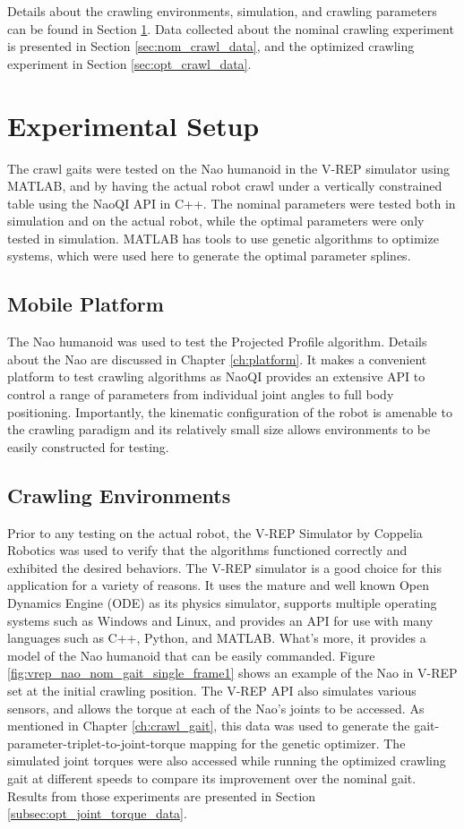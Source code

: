 Details about the crawling environments, simulation, and crawling parameters can be found in
Section \ref{sec:crawl_exp_setup}. Data collected about the nominal crawling experiment is
presented in Section \ref{sec:nom_crawl_data}, and the optimized crawling experiment in 
Section \ref{sec:opt_crawl_data}.

\FloatBarrier
\section{Experimental Setup} \label{sec:crawl_exp_setup}
The crawl gaits were tested on the Nao humanoid in the V-REP simulator using MATLAB,
and by having the actual robot crawl under a vertically constrained table using the NaoQI API in C++.
The nominal parameters were tested both in simulation and on the actual robot, while
the optimal parameters were only tested in simulation. MATLAB has tools to use genetic
algorithms to optimize systems, which were used here to generate the optimal parameter
splines.

\subsection{Mobile Platform}
The Nao humanoid was used to test the Projected Profile algorithm.
Details about the Nao are discussed in Chapter \ref{ch:platform}. It makes
a convenient platform to test crawling algorithms as NaoQI provides an extensive
API to control a range of parameters from individual joint angles to 
full body positioning. Importantly, the kinematic configuration of the robot is amenable 
to the crawling paradigm and its relatively small size allows environments to be
easily constructed for testing.

\subsection{Crawling Environments} \label{subsec:crawl_environments}
Prior to any testing on the actual robot, the V-REP Simulator by Coppelia Robotics was used
to verify that the algorithms functioned correctly and exhibited the desired behaviors.
The V-REP simulator is a good choice for this application for a variety of reasons.
It uses the mature and well known Open Dynamics Engine (ODE) as its physics simulator, supports multiple
operating systems such as Windows and Linux, and provides an API for use with many
languages such as C++, Python, and MATLAB. What's more, it provides a model of the Nao
humanoid that can be easily commanded.
Figure \ref{fig:vrep_nao_nom_gait_single_frame1} shows an example of the Nao in V-REP
set at the initial crawling position.
The V-REP API also simulates various sensors, and allows the torque at each of the Nao's
joints to be accessed. As mentioned in Chapter \ref{ch:crawl_gait}, this data was used
to generate the gait-parameter-triplet-to-joint-torque mapping for the genetic optimizer.
The simulated joint torques were also accessed while running the optimized crawling
gait at different speeds to compare its improvement over the nominal gait.
Results from those experiments are presented in Section \ref{subsec:opt_joint_torque_data}.


